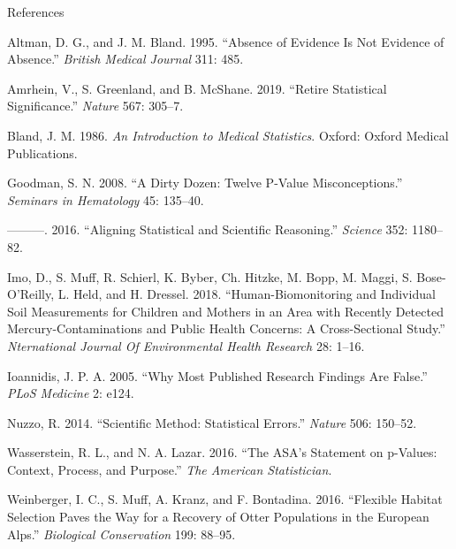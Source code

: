 \documentclass[
  10pt,
  ignorenonframetext,
]{beamer}
\newlength{\cslhangindent}
\newlength{\cslentryspacingunit} %
\newenvironment{CSLReferences}[2] %
 {%
  \setlength{\parindent}{0pt}
  \ifodd #1
  \let\oldpar\par
  \def\par{\hangindent=\cslhangindent\oldpar}
  \fi
  \setlength{\parskip}{#2\cslentryspacingunit}
 }%
 {}
\begin{document}
\begin{frame}{References}
\protect\hypertarget{references}{}
\scriptsize

\hypertarget{refs}{}
\begin{CSLReferences}{1}{0}
\leavevmode{}%
Altman, D. G., and J. M. Bland. 1995. {``Absence of Evidence Is Not
Evidence of Absence.''} \emph{British Medical Journal} 311: 485.

\leavevmode{}%
Amrhein, V., S. Greenland, and B. McShane. 2019. {``Retire Statistical
Significance.''} \emph{Nature} 567: 305--7.

\leavevmode{}%
Bland, J. M. 1986. \emph{An Introduction to Medical Statistics}. Oxford:
Oxford Medical Publications.

\leavevmode{}%
Goodman, S. N. 2008. {``A Dirty Dozen: Twelve {P}-Value
Misconceptions.''} \emph{Seminars in Hematology} 45: 135--40.

\leavevmode{}%
---------. 2016. {``Aligning Statistical and Scientific Reasoning.''}
\emph{Science} 352: 1180--82.

\leavevmode{}%
Imo, D., S. Muff, R. Schierl, K. Byber, Ch. Hitzke, M. Bopp, M. Maggi,
S. Bose-O'Reilly, L. Held, and H. Dressel. 2018. {``Human-Biomonitoring
and Individual Soil Measurements for Children and Mothers in an Area
with Recently Detected Mercury-Contaminations and Public Health
Concerns: A Cross-Sectional Study.''} \emph{Nternational Journal Of
Environmental Health Research} 28: 1--16.

\leavevmode{}%
Ioannidis, J. P. A. 2005. {``Why Most Published Research Findings Are
False.''} \emph{PLoS Medicine} 2: e124.

\leavevmode{}%
Nuzzo, R. 2014. {``Scientific Method: Statistical Errors.''}
\emph{Nature} 506: 150--52.

\leavevmode{}%
Wasserstein, R. L., and N. A. Lazar. 2016. {``The {ASA}'s Statement on
p-Values: Context, Process, and Purpose.''} \emph{The American
Statistician}.

\leavevmode{}%
Weinberger, I. C., S. Muff, A. Kranz, and F. Bontadina. 2016.
{``Flexible Habitat Selection Paves the Way for a Recovery of Otter
Populations in the {E}uropean {A}lps.''} \emph{Biological Conservation}
199: 88--95.

\end{CSLReferences}
\end{frame}
\end{document}
